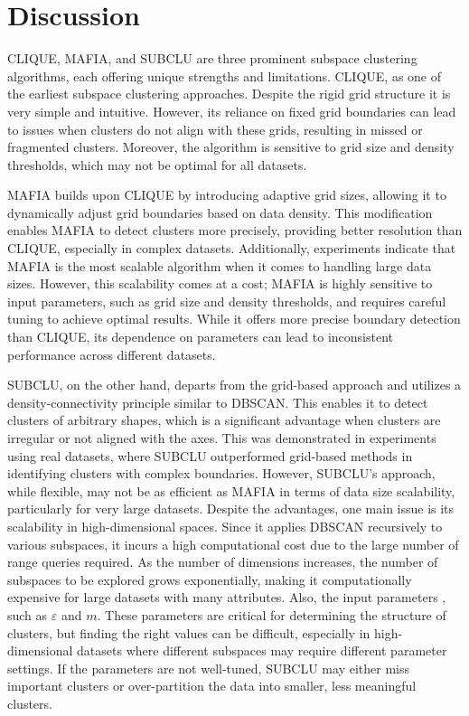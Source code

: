 \section{Discussion}
CLIQUE, MAFIA, and SUBCLU are three prominent subspace clustering algorithms, each offering unique strengths and limitations. CLIQUE, as one of the earliest subspace clustering approaches. Despite the rigid grid structure it is very simple and intuitive. However, its reliance on fixed grid boundaries can lead to issues when clusters do not align with these grids, resulting in missed or fragmented clusters. Moreover, the algorithm is sensitive to grid size and density thresholds, which may not be optimal for all datasets.

MAFIA builds upon CLIQUE by introducing adaptive grid sizes, allowing it to dynamically adjust grid boundaries based on data density. This modification enables MAFIA to detect clusters more precisely, providing better resolution than CLIQUE, especially in complex datasets. Additionally, experiments indicate that MAFIA is the most scalable algorithm when it comes to handling large data sizes. However, this scalability comes at a cost; MAFIA is highly sensitive to input parameters, such as grid size and density thresholds, and requires careful tuning to achieve optimal results. While it offers more precise boundary detection than CLIQUE, its dependence on parameters can lead to inconsistent performance across different datasets.

SUBCLU, on the other hand, departs from the grid-based approach and utilizes a density-connectivity principle similar to DBSCAN. This enables it to detect clusters of arbitrary shapes, which is a significant advantage when clusters are irregular or not aligned with the axes. This was demonstrated in experiments using real datasets, where SUBCLU outperformed grid-based methods in identifying clusters with complex boundaries. However, SUBCLU’s approach, while flexible, may not be as efficient as MAFIA in terms of data size scalability, particularly for very large datasets. Despite the advantages, one main issue is its scalability in high-dimensional spaces. Since it applies DBSCAN recursively to various subspaces, it incurs a high computational cost due to the large number of range queries required. As the number of dimensions increases, the number of subspaces to be explored grows exponentially, making it computationally expensive for large datasets with many attributes. Also, the input parameters , such as $\varepsilon$ and $m$. These parameters are critical for determining the structure of clusters, but finding the right values can be difficult, especially in high-dimensional datasets where different subspaces may require different parameter settings. If the parameters are not well-tuned, SUBCLU may either miss important clusters or over-partition the data into smaller, less meaningful clusters.

